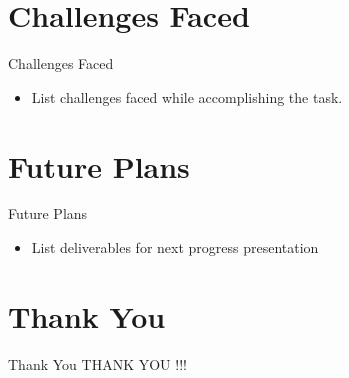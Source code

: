 \documentclass[10pt, a4paper]{beamer}
\begin{document}
\section{Challenges Faced}
\begin{frame}{Challenges Faced}
	\begin{itemize}
		\item List challenges faced while accomplishing the task.  
	\end{itemize}
\end{frame}

\section{Future Plans}
\begin{frame}{Future Plans}
	\begin{itemize}
		\item List deliverables for next progress presentation  
	\end{itemize}
\end{frame}


\section{Thank You}
\begin{frame}{Thank You}
	\centering THANK YOU !!!
\end{frame}
\end{document}
